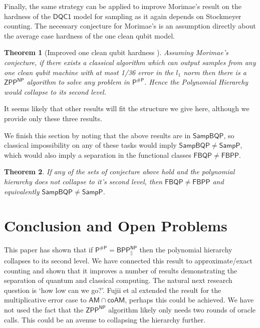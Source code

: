 \documentclass{article}
\newtheorem{theorem}{Theorem}
\begin{document}
Finally, the same strategy can be applied to improve Morimae's result \cite{morimae2017hardness} on the hardness of the $\mathsf{DQC1}$ model for sampling \cite{fujii2015power} as it again depends on Stockmeyer counting. The necessary conjecture for Morimae's is an assumption directly about the average case hardness of the one clean qubit model.

\begin{theorem}[Improved one clean qubit hardness \cite{morimae2017hardness}]
    Assuming Morimae's conjecture, if there exists a classical algorithm which can output samples from any one clean qubit machine with at most 1/36 error in the $l_1$ norm then there is a $\mathsf{ZPP^{NP}}$ algorithm to solve any problem in $\mathsf{P^{\#P}}$. Hence the Polynomial Hierarchy would collapse to its second level.
\end{theorem}

It seems likely that other results will fit the structure we give here, although we provide only these three results.

We finish this section by noting that the above results are in $\mathsf{SampBQP}$, so classical impossibility on any of these tasks would imply $\mathsf{SampBQP\neq SampP}$, which would also imply a separation in the functional classes $\mathsf{FBQP \neq FBPP}$\cite{aaronson2014equivalence}.
\begin{theorem}
    If any of the sets of conjecture above hold and the polynomial hierarchy does not collapse to it's second level, then $\mathsf{FBQP\neq FBPP}$ and equivalently $\mathsf{SampBQP \neq SampP}$.
\end{theorem}

\section{Conclusion and Open Problems}
This paper has shown that if $\mathsf{P^{\#P}=BPP^{NP}_{\parallel}}$ then the polynomial hierarchy collapses to its second level. We have connected this result to approximate/exact counting and shown that it improves a number of results demonstrating the separation of quantum and classical computing.
The natural next research question is `how low can we go?'. Fujii et al \cite{fujii2015power} extended the result for the multiplicative error case to $\mathsf{AM \cap coAM}$, perhaps this could be achieved. We have not used the fact that the $\mathsf{ZPP^{NP}}$ algorithm likely only needs two rounds of oracle calls. This could be an avenue to collapsing the hierarchy further.
\end{document}
